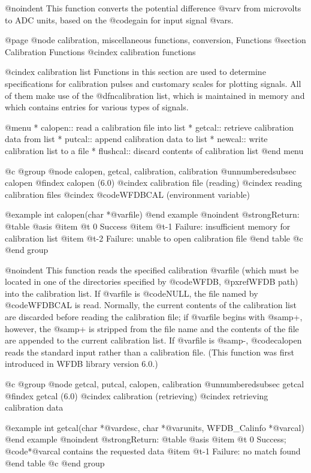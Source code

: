 {{{{{{{{{@noindent
This function converts the potential difference @var{v} from microvolts
to ADC units, based on the @code{gain} for input signal @var{s}.

@page
@node     calibration, miscellaneous functions, conversion, Functions
@section Calibration Functions
@cindex calibration functions

@cindex calibration list
Functions in this section are used to determine specifications for
calibration pulses and customary scales for plotting signals.  All of
them make use of the @dfn{calibration list}, which is maintained in
memory and which contains entries for various types of signals.

@menu
* calopen::			read a calibration file into list
* getcal::			retrieve calibration data from list
* putcal::			append calibration data to list
* newcal::			write calibration list to a file
* flushcal::			discard contents of calibration list
@end menu

@c @group
@node   calopen, getcal, calibration, calibration
@unnumberedsubsec calopen
@findex calopen (6.0)
@cindex calibration file (reading)
@cindex reading calibration files
@cindex @code{WFDBCAL} (environment variable)

@example
int calopen(char *@var{file})
@end example
@noindent
@strong{Return:}
@table @asis
@item @t{ 0}
Success
@item @t{-1}
Failure: insufficient memory for calibration list
@item @t{-2}
Failure: unable to open calibration file
@end table
@c @end group

@noindent
This function reads the specified calibration @var{file} (which must be
located in one of the directories specified by @code{WFDB},
@pxref{WFDB path}) into the calibration list.  If @var{file} is
@code{NULL}, the file named by @code{WFDBCAL} is read.  Normally, the
current contents of the calibration list are discarded before reading
the calibration file; if @var{file} begins with @samp{+}, however, the
@samp{+} is stripped from the file name and the contents of the file are
appended to the current calibration list.  If @var{file} is @samp{-},
@code{calopen} reads the standard input rather than a calibration file.
(This function was first introduced in WFDB library version 6.0.)

@c @group
@node   getcal, putcal, calopen, calibration
@unnumberedsubsec getcal
@findex getcal (6.0)
@cindex calibration (retrieving)
@cindex retrieving calibration data

@example
int getcal(char *@var{desc}, char *@var{units}, WFDB_Calinfo *@var{cal})
@end example
@noindent
@strong{Return:}
@table @asis
@item @t{ 0}
Success;  @code{*@var{cal}} contains the requested data
@item @t{-1}
Failure: no match found
@end table
@c @end group

}}}}}}}}}
